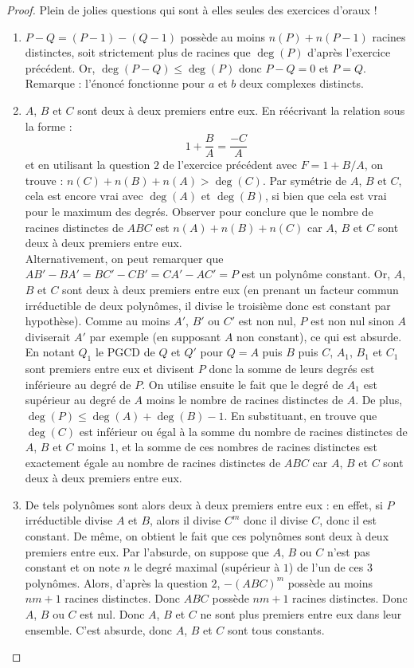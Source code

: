 \documentclass[french,a4paper]{article}
\theoremstyle{plain}
\theoremstyle{definition}
\theoremstyle{remark}
\begin{document}
\begin{proof}
	Plein de jolies questions qui sont à elles seules des exercices d'oraux !
	\begin{enumerate}
		\item $P-Q=(P-1)-(Q-1)$ possède au moins $n(P)+n(P-1)$ racines distinctes, soit strictement plus de racines que $\deg(P)$ d'après l'exercice précédent. Or, $\deg(P-Q)\leqslant \deg(P)$ donc $P-Q=0$ et $P=Q$. \\
		Remarque : l'énoncé fonctionne pour $a$ et $b$ deux complexes distincts.
		\item $A$, $B$ et $C$ sont deux à deux premiers entre eux. En réécrivant la relation sous la forme : $$1+\frac{B}{A}=\frac{-C}{A}$$ et en utilisant la question $2$ de l'exercice précédent avec $F=1+B/A$, on trouve : $n(C)+n(B)+n(A)>\deg(C)$. Par symétrie de $A$, $B$ et $C$, cela est encore vrai avec $\deg(A)$ et $\deg(B)$, si bien que cela est vrai pour le maximum des degrés. Observer pour conclure que le nombre de racines distinctes de $ABC$ est $n(A)+n(B)+n(C)$ car $A$, $B$ et $C$ sont deux à deux premiers entre eux.\\
		Alternativement, on peut remarquer que $AB'-BA'=BC'-CB'=CA'-AC'=P$ est un polynôme constant. Or, $A$, $B$ et $C$ sont deux à deux premiers entre eux (en prenant un facteur commun irréductible de deux polynômes, il divise le troisième donc est constant par hypothèse). Comme au moins $A'$, $B'$ ou $C'$ est non nul, $P$ est non nul sinon $A$ diviserait $A'$ par exemple (en supposant $A$ non constant), ce qui est absurde. En notant $Q_1$ le PGCD de $Q$ et $Q'$ pour $Q=A$ puis $B$ puis $C$, $A_1$, $B_1$ et $C_1$ sont premiers entre eux et divisent $P$ donc la somme de leurs degrés est inférieure au degré de $P$. On utilise ensuite le fait que le degré de $A_1$ est supérieur au degré de $A$ moins le nombre de racines distinctes de $A$. De plus, $\deg(P)\leqslant\deg(A)+\deg(B)-1$. En substituant, en trouve que $\deg(C)$ est inférieur ou égal à la somme du nombre de racines distinctes de $A$, $B$ et $C$ moins $1$, et la somme de ces nombres de racines distinctes est exactement égale au nombre de racines distinctes de $ABC$ car $A$, $B$ et $C$ sont deux à deux premiers entre eux.
		\item De tels polynômes sont alors deux à deux premiers entre eux : en effet, si $P$ irréductible divise $A$ et $B$, alors il divise $C^m$ donc il divise $C$, donc il est constant. De même, on obtient le fait que ces polynômes sont deux à deux premiers entre eux. Par l'absurde, on suppose que $A$, $B$ ou $C$ n'est pas constant et on note $n$ le degré maximal (supérieur à $1$) de l'un de ces $3$ polynômes. Alors, d'après la question $2$, $-(ABC)^m$ possède au moins $nm+1$ racines distinctes. Donc $ABC$ possède $nm+1$ racines distinctes. Donc $A$, $B$ ou $C$ est nul. Donc $A$, $B$ et $C$ ne sont plus premiers entre eux dans leur ensemble. C'est absurde, donc $A$, $B$ et $C$ sont tous constants.
	\end{enumerate}
\end{proof}
\end{document}

